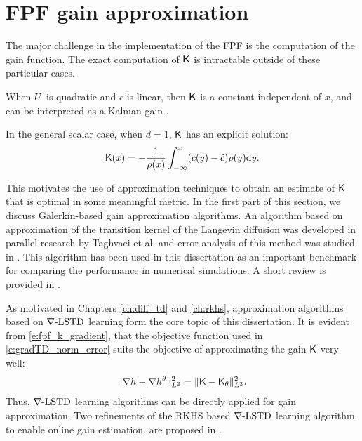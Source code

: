\section{FPF gain approximation}
The major challenge in the implementation of the FPF is the computation of the gain function. The exact computation of $\text{\sf K}$ is intractable outside of these particular cases. 
\begin{romannum}
\item When $U$ is quadratic and $c$ is linear,  then $\text{\sf K}$ is a constant independent of $x$, and can be interpreted as a Kalman gain \cite{yanlaumehmey13}. 

\item In the general scalar case, when $d=1$, $\text{\sf K}$ has an explicit solution:
\begin{equation}
\kFPF(x) = - \frac{1}{\pr(x)} \int_{-\infty}^{x} (c(y) - \hat{c}) \pr(y) \ud y.
\label{e:kfpf1d}
\end{equation}
\end{romannum}

This motivates the use of approximation techniques to obtain an estimate of $\text{\sf K}$ that is optimal in some meaningful metric. In the first part of this section, we discuss Galerkin-based gain approximation algorithms. An algorithm based on approximation of the transition kernel of the Langevin diffusion was developed in parallel research by Taghvaei et al. \cite{tagmeh16} and error analysis of this method was studied in \cite{tagmehmey17}. This algorithm has been used in this dissertation as an important benchmark for comparing the performance in numerical simulations. A short review is provided in . 

As motivated in Chapters \ref{ch:diff_td} and \ref{ch:rkhs}, approximation algorithms based on $\nabla\text{-LSTD}$ learning form the core topic of this dissertation. It is evident from \eqref{e:fpf_k_gradient}, that the objective function used in \eqref{e:gradTD_norm_error} suits the objective of approximating the gain $\text{\sf K}$ very well:
\begin{equation}
\| \nabla h - \nabla h^\theta \|^2_{L^2} = \| \text{\sf K} - \text{\sf K}_\theta \|^2_{L^2}.
\end{equation}
Thus, $\nabla\text{-LSTD}$ learning algorithms can be directly applied for gain approximation. Two refinements of the RKHS based $\nabla\text{-LSTD}$ learning algorithm to enable online gain estimation, are proposed in .

